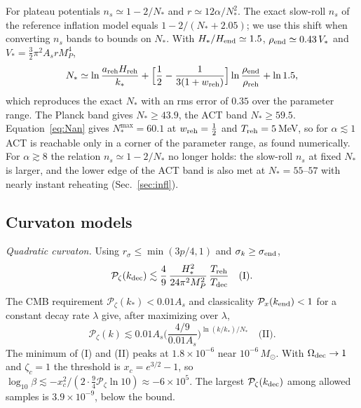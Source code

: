 \documentclass[aps,prd,onecolumn,superscriptaddress,nofootinbib,floatfix]{revtex4-2}
\newcommand{\Msun}{M_\odot}
\newcommand{\Treh}{T_{\rm reh}}
\newcommand{\wreh}{w_{\rm reh}}
\newcommand{\Ns}{N_\ast}
\begin{document}
For plateau potentials $n_s\simeq1-2/\Ns$ and $r\simeq12\alpha/\Ns^2$. The exact slow-roll $n_s$ of the reference inflation model equals $1-2/(\Ns+2.05)$; we use this shift when converting $n_s$ bands to bounds on $\Ns$. With $H_\ast/H_{\rm end}\simeq1.5$, $\rho_{\rm end}\simeq0.43\,V_\ast$ and $V_\ast=\frac32\pi^2A_srM_P^4$,
\begin{equation}
\Ns\simeq\ln\frac{a_{\rm reh}H_{\rm reh}}{k_\ast}+\Big[\frac12-\frac1{3(1+\wreh)}\Big]\ln\frac{\rho_{\rm end}}{\rho_{\rm reh}}+\ln1.5,
\label{eq:Nan}
\end{equation}
which reproduces the exact $\Ns$ with an rms error of $0.35$ over the parameter range. The Planck band gives $\Ns\ge43.9$, the ACT band $\Ns\ge59.5$. Equation~\eqref{eq:Nan} gives $\Ns^{\max}=60.1$ at $\wreh=\frac12$ and $\Treh=5$\,MeV, so for $\alpha\lesssim1$ ACT is reachable only in a corner of the parameter range, as found numerically. For $\alpha\gtrsim8$ the relation $n_s\simeq1-2/\Ns$ no longer holds: the slow-roll $n_s$ at fixed $\Ns$ is larger, and the lower edge of the ACT band is also met at $\Ns=55$--$57$ with nearly instant reheating (Sec.~\ref{sec:infl}).

\subsection{Curvaton models}

\emph{Quadratic curvaton.} Using $r_\sigma\le\min(3p/4,1)$ and $\sigma_k\ge\sigma_{\rm end}$,
\begin{equation}
\mathcal{P}_\zeta(k_{\rm dec})\lesssim\frac49\,\frac{H_\ast^2}{24\pi^2M_P^2}\,\frac{\Treh}{T_{\rm dec}}\quad\text{(I)}.
\end{equation}
The CMB requirement $\mathcal{P}_\zeta(k_\ast)<0.01A_s$ and classicality $\mathcal{P}_x(k_{\rm end})<1$ for a constant decay rate $\lambda$ give, after maximizing over $\lambda$,
\begin{equation}
\mathcal{P}_\zeta(k)\lesssim0.01A_s\Big(\frac{4/9}{0.01A_s}\Big)^{\ln(k/k_\ast)/\Ns}\quad\text{(II)}.
\end{equation}
The minimum of (I) and (II) peaks at $1.8\times10^{-6}$ near $10^{-6}\,\Msun$. With $\Omega_{\rm dec}\to1$ and $\zeta_c=1$ the threshold is $x_c=e^{3/2}-1$, so $\log_{10}\beta\lesssim-x_c^2/(2\cdot\frac94\mathcal{P}_\zeta\ln10)\approx-6\times10^{5}$. The largest $\mathcal{P}_\zeta(k_{\rm dec})$ among allowed samples is $3.9\times10^{-9}$, below the bound.
\end{document}
